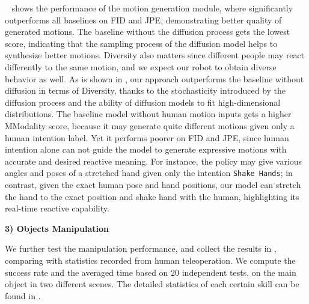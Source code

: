 ~ shows the performance of the motion generation module, where \our significantly outperforms all baselines on FID and JPE, demonstrating better quality of generated motions. The baseline without the diffusion process gets the lowest score, indicating that the sampling process of the diffusion model helps to synthesize better motions.
Diversity also matters since different people may react differently to the same motion, and we expect our robot to obtain diverse behavior as well. As is shown in , our approach outperforms the baseline without diffusion in terms of Diversity, thanks to the stochasticity introduced by the diffusion process and the ability of diffusion models to fit high-dimensional distributions. The baseline model without human motion inputs gets a higher MModality score, because it may generate quite different motions given only a human intention label. Yet it performs poorer on FID
and JPE, since human intention alone can not guide the model to generate expressive motions with accurate and desired reactive meaning. For instance, the policy may give various angles and poses of a stretched hand given only the intention \texttt{Shake Hands}; in contrast, given the exact human pose and hand positions, our model can stretch the hand to the exact position and shake hand with the human, highlighting its real-time reactive capability.


\noindent\textbf{3) Objects Manipulation}
\label{sec:exp-manip}

We further test the manipulation performance, and collect the results in , comparing with statistics recorded from human teleoperation. We compute the success rate and the averaged time based on $20$ independent tests, on the main object in two different scenes.
The detailed statistics of each certain skill can be found in .%


